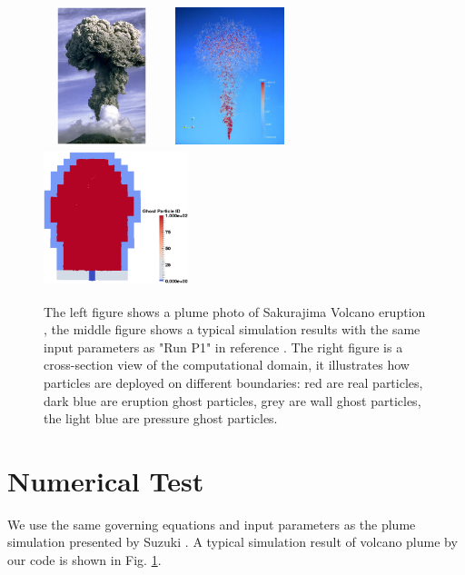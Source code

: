 \documentclass[procedia]{easychair}
\begin{document}
\begin{figure}[!t]
\centering
\includegraphics[width=3.4cm,height=4.0cm]{plume_photo}
\hfil
\includegraphics[width=3.8cm,height=4.0cm]{Plume_simulation}
\hfil
\includegraphics[width=4.2cm,height=4.0cm]{Boundary_condition}
\caption{The left figure shows a plume photo of Sakurajima Volcano eruption \cite{PlumePhoto:online}, the middle figure shows a typical simulation results with the same input parameters as "Run P1" in reference \cite{suzuki2005numerical}. The right figure is a cross-section view of the computational domain, it illustrates how particles are deployed on different boundaries: red are real particles, dark blue are eruption ghost particles, grey are wall ghost particles, the light blue are pressure ghost particles.}
\label{fig:Plume}
\end{figure}
\section{Numerical Test}
We use the same governing equations and input parameters as the plume simulation presented by Suzuki \cite{suzuki2005numerical}. %
A typical simulation result of volcano plume by our code is shown in Fig. \ref{fig:Plume}.
%
\end{document}
